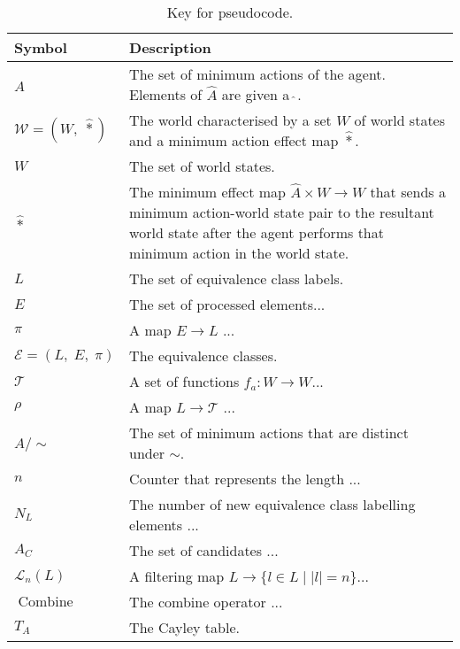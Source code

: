 \begin{table*}[htbp]
  \begin{fullwidth}
    \centering
    \begin{tabularx}{\linewidth}{lX}
      \toprule
      \textbf{Symbol}                    & \textbf{Description} \\
      \midrule
      $\hat{A}$                          & The set of minimum actions of the agent. Elements of $\hat{A}$ are given a $\hat{\ }$. \\
      $\mathscr{W} = (W, \; \hat{\ast})$ & The world characterised by a set $W$ of world states and a minimum action effect map $\hat{\ast}$. \\
      $W$                                & The set of world states. \\
      $\hat{\ast}$                       & The minimum effect map $\hat{A} \times W \to W$ that sends a minimum action-world state pair to the resultant world state after the agent performs that minimum action in the world state. \\
      $L$                                & The set of equivalence class labels. \\
      $E$                                & The set of processed elements... \\
      $\pi$                              & A map $E \to L$ ... \\
      $\mathcal{E} = (L, \; E, \; \pi)$  & The equivalence classes. \\
      $\mathcal{T}$                      & A set of functions $f_{a}: W \to W$... \\
      $\rho$                             & A map $L \to \mathcal{T}$ ... \\
      $\hat{A}/\sim$                     & The set of minimum actions that are distinct under $\sim$. \\
      $n$                                & Counter that represents the length ... \\
      $N_{L}$                            & The number of new equivalence class labelling elements ... \\
      $A_{C}$                            & The set of candidates ... \\
      $\mathcal{L}_{n}(L)$               & A filtering map $L \to \{ l \in L \mid |l| = n \}$... \\
      $\operatorname{Combine}$           & The combine operator ... \\
      $T_{A}$                            & The Cayley table. \\
      \bottomrule
    \end{tabularx}
    \caption{Key for pseudocode.}
  \end{fullwidth}
\end{table*}



